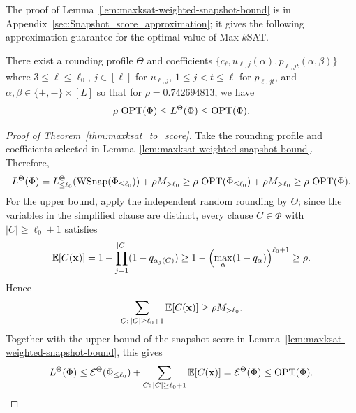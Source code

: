 The proof of Lemma~\ref{lem:maxksat-weighted-snapshot-bound} is in Appendix~\ref{sec:Snapshot_score_approximation}; it gives the following approximation guarantee for the optimal value of Max-$k$SAT.




\begin{theorem} 
\label{thm:maxksat_to_score}
There exist a  rounding profile $\Theta$ and coefficients $\{c_{\ell}, u_{\ell,j}(\alpha), p_{\ell,jt}(\alpha,\beta)\}$ where  $3\le \ell\le \ell_0$, $j\in[\ell]$ for $u_{\ell,j}$, $1\le j<t\le\ell$ for $p_{\ell,jt}$, and $\alpha,\beta\in \{+,-\}\times [L]$ so that for  $\rho = 0.742694813$, we have 
\[
  \rho\,\operatorname{OPT}(\Phi)\le L^{\Theta}(\Phi)\le\operatorname{OPT}(\Phi).
\]

\end{theorem}



\begin{proof}[Proof of Theorem~\ref{thm:maxksat_to_score}]
Take the rounding profile and coefficients selected in  Lemma~\ref{lem:maxksat-weighted-snapshot-bound}.
Therefore, 
\[
 L^\Theta(\Phi )  = L_{\le\ell_0}^\Theta(\operatorname{WSnap}(\Phi_{\le\ell_0})) + \rho M_{> \ell_0} 
  \ge\rho\,\operatorname{OPT}(\Phi_{\le\ell_0})+\rho M_{>\ell_0}
  \ge\rho\,\operatorname{OPT}(\Phi).
\]
For the upper bound, apply the independent random rounding by $\Theta$; since the variables in the  simplified clause are distinct,  every clause $C\in \Phi$ with $|C|\ge \ell_0+1$  satisfies
\[
  \mathbb E[C(\mathbf{x})]
  =1-\prod_{j=1}^{|C|}(1-q_{\alpha_j(C)})
  \ge1-\left(\max_{\alpha}(1-q_\alpha)\right)^{\ell_0+1}
  \ge\rho.
\]
Hence
\[
\sum_{C:\,|C|\ge \ell_0+1}\mathbb E[C(\mathbf{x})] \ge \rho M_{>\ell_0}.
\]
Together with the  upper bound of the snapshot score in Lemma~\ref{lem:maxksat-weighted-snapshot-bound}, this gives
\[
  L^\Theta(\Phi)
  \le\mathcal E^\Theta(\Phi_{\le\ell_0})+\sum_{C:\,|C|\ge \ell_0+1}\mathbb E[C(\mathbf{x})]
  =\mathcal E^\Theta(\Phi)\le\operatorname{OPT}(\Phi). \qedhere
\] 
\end{proof}
